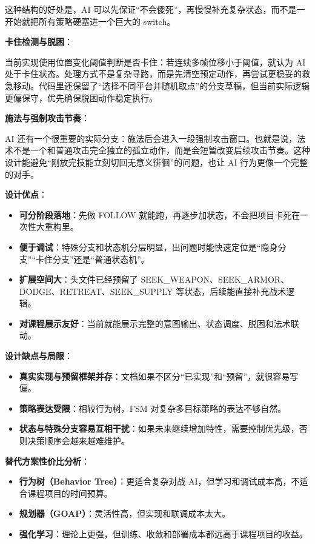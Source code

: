 ﻿\documentclass[utf8]{ctexart}
\begin{document}
这种结构的好处是，AI 可以先保证“不会傻死”，再慢慢补充复杂状态，而不是一开始就把所有策略硬塞进一个巨大的 switch。

\textbf{卡住检测与脱困}：

当前实现使用位置变化阈值判断是否卡住：若连续多帧位移小于阈值，就认为 AI 处于卡住状态。处理方式不是复杂寻路，而是先清空预定动作，再尝试更稳妥的救急移动。代码里还保留了“选择不同平台并随机取点”的分支草稿，但当前实际逻辑更偏保守，优先确保脱困动作稳定执行。

\textbf{施法与强制攻击节奏}：

AI 还有一个很重要的实际分支：施法后会进入一段强制攻击窗口。也就是说，法术不是一个和普通攻击完全独立的孤立动作，而是会短暂改变后续攻击节奏。这种设计能避免“刚放完技能立刻切回无意义徘徊”的问题，也让 AI 行为更像一个完整的对手。

\textbf{设计优点}：

\begin{itemize}
  \item \textbf{可分阶段落地}：先做 FOLLOW 就能跑，再逐步加状态，不会把项目卡死在一次性大重构里。
  \item \textbf{便于调试}：特殊分支和状态机分层明显，出问题时能快速定位是“隐身分支”“卡住分支”还是“普通状态机”。
  \item \textbf{扩展空间大}：头文件已经预留了 SEEK\_WEAPON、SEEK\_ARMOR、DODGE、RETREAT、SEEK\_SUPPLY 等状态，后续能直接补充战术逻辑。
  \item \textbf{对课程展示友好}：当前就能展示完整的意图输出、状态调度、脱困和法术联动。
\end{itemize}

\textbf{设计缺点与局限}：

\begin{itemize}
  \item \textbf{真实实现与预留框架并存}：文档如果不区分“已实现”和“预留”，就很容易写偏。
  \item \textbf{策略表达受限}：相较行为树，FSM 对复杂多目标策略的表达不够自然。
  \item \textbf{状态与特殊分支容易互相干扰}：如果未来继续增加特性，需要控制优先级，否则决策顺序会越来越难维护。
\end{itemize}

\textbf{替代方案性价比分析}：

\begin{itemize}
  \item \textbf{行为树（Behavior Tree）}：更适合复杂对战 AI，但学习和调试成本高，不适合课程项目的时间预算。
  \item \textbf{规划器（GOAP）}：灵活性高，但实现和联调成本太大。
  \item \textbf{强化学习}：理论上更强，但训练、收敛和部署成本都远高于课程项目的收益。
\end{itemize}
\end{document}

